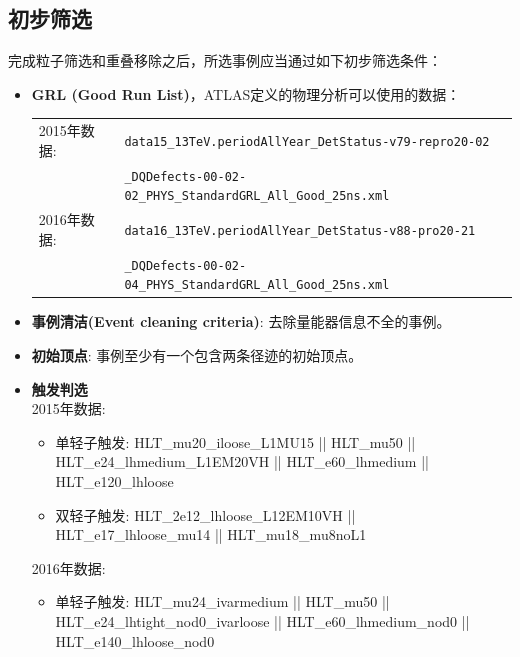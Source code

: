 \subsection{初步筛选}
完成粒子筛选和重叠移除之后，所选事例应当通过如下初步筛选条件：
\begin{itemize}
  \item \textbf{GRL (Good Run List)}，ATLAS定义的物理分析可以使用的数据：\\
	\begin{tabular}{ll}
    2015年数据: & {\tt data15\_13TeV.periodAllYear\_DetStatus-v79-repro20-02} \\
                      & {\tt \_DQDefects-00-02-02\_PHYS\_StandardGRL\_All\_Good\_25ns.xml} \\
   2016年数据: & {\tt data16\_13TeV.periodAllYear\_DetStatus-v88-pro20-21} \\
                    & {\tt \_DQDefects-00-02-04\_PHYS\_StandardGRL\_All\_Good\_25ns.xml} \\
  \end{tabular}
  \item \textbf{事例清洁(Event cleaning criteria)}: 去除量能器信息不全的事例。%
  \item \textbf{初始顶点}: 事例至少有一个包含两条径迹的初始顶点。%
  \item \textbf{触发判选} \\
   2015年数据:
    \begin{itemize}
     \item 单轻子触发: HLT\_mu20\_iloose\_L1MU15 || HLT\_mu50 || HLT\_e24\_lhmedium\_L1EM20VH ||
     HLT\_e60\_lhmedium || HLT\_e120\_lhloose 
     \item 双轻子触发: HLT\_2e12\_lhloose\_L12EM10VH || HLT\_e17\_lhloose\_mu14 || HLT\_mu18\_mu8noL1
    \end{itemize}
  2016年数据:
  \begin{itemize}
    \item 单轻子触发: HLT\_mu24\_ivarmedium || HLT\_mu50 || HLT\_e24\_lhtight\_nod0\_ivarloose ||
      HLT\_e60\_lhmedium\_nod0 || HLT\_e140\_lhloose\_nod0  

\end{itemize}
\end{itemize}

